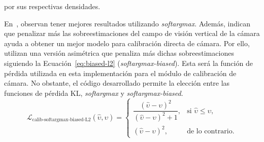 por sus respectivas densidades.
\par
En~\cite{SPEC}, observan tener mejores resultados utilizando \emph{softargmax}.
Además, indican que penalizar más las sobreestimaciones del campo de visión vertical de la cámara
ayuda a obtener un mejor modelo para calibración directa de cámara. Por ello, utilizan una versión asimétrica que
penaliza más dichas sobreestimaciones siguiendo la Ecuación~\ref{eq:biased-l2} (\emph{softargmax-biased}).
Esta será la función de pérdida utilizada en esta implementación para el módulo de calibración de cámara.
No obstante, el código desarrollado permite la elección entre las funciones de pérdida KL, \emph{softargmax} y \emph{softargmax-biased}.
\begin{equation}\label{eq:biased-l2}
\mathcal{L}_{\text{calib-softargmax-biased-L2}}(\hat{\upsilon}, \upsilon)=
\begin{cases}
\dfrac{(\hat{\upsilon}-\upsilon)^2}
{(\hat{\upsilon}-\upsilon)^2+1},
& \text{si } \hat{\upsilon}\le \upsilon, \\[8pt]
(\hat{\upsilon}-\upsilon)^2,
& \text{de lo contrario.}
\end{cases}
\end{equation}

